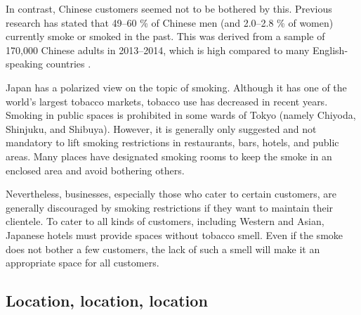 \documentclass[smallextended,natbib]{svjour3}       %
\begin{document}
    In contrast, Chinese customers seemed not to be bothered by this. Previous research has stated that 49–60 \% of Chinese men (and 2.0–2.8 \% of women) currently smoke or smoked in the past. This was derived from a sample of 170,000 Chinese adults in 2013–2014, which is high compared to many English-speaking countries \cite[][]{zhang2019tobacco,who2015tobacco}.

    Japan has a polarized view on the topic of smoking. Although it has one of the world’s largest tobacco markets, tobacco use has decreased in recent years. Smoking in public spaces is prohibited in some wards of Tokyo (namely Chiyoda, Shinjuku, and Shibuya). However, it is generally only suggested and not mandatory to lift smoking restrictions in restaurants, bars, hotels, and public areas. Many places have designated smoking rooms to keep the smoke in an enclosed area and avoid bothering others.

    Nevertheless, businesses, especially those who cater to certain customers, are generally discouraged by smoking restrictions if they want to maintain their clientele. To cater to all kinds of customers, including Western and Asian, Japanese hotels must provide spaces without tobacco smell. Even if the smoke does not bother a few customers, the lack of such a smell will make it an appropriate space for all customers.

  \subsection{Location, location, location}\label{disc:location}
\end{document}
